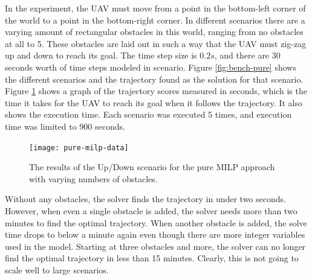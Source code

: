 In the experiment, the UAV must move from a point in the bottom-left corner of the world to a point in the bottom-right corner. In different scenarios there are a varying amount of rectangular obstacles in this world, ranging from no obstacles at all to 5. These obstacles are laid out in such a way that the UAV must zig-zag up and down to reach its goal. The time step size is $0.2s$, and there are 30 seconds worth of time steps modeled in scenario. Figure \ref{fig:bench-pure} shows the different scenarios and the trajectory found as the solution for that scenario. Figure \ref{fig:pure-data} shows a graph of the trajectory scores measured in seconds, which is the time it takes for the UAV to reach its goal when it follows the trajectory. It also shows the execution time. Each scenario was executed 5 times, and execution time was limited to 900 seconds.

\begin{figure}[t]
	\centering
	\texttt{[image: pure-milp-data]}
	\caption[The results for the pure MILP approach ]{The results of the Up/Down scenario for the pure MILP approach with varying numbers of obstacles.}
	\label{fig:pure-data}
\end{figure}

Without any obstacles, the solver finds the trajectory in under two seconds. However, when even a single obstacle is added, the solver needs more than two minutes to find the optimal trajectory. When another obstacle is added, the solve time drops to below a minute again even though there are more integer variables used in the model. Starting at three obstacles and more, the solver can no longer find the optimal trajectory in less than 15 minutes. Clearly, this is not going to scale well to large scenarios.
